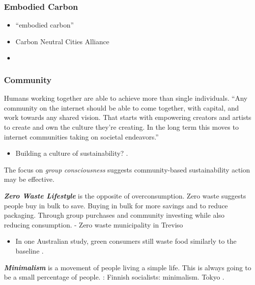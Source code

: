 \documentclass[
  letterpaper,
  DIV=11,
  numbers=noendperiod]{scrartcl}
\providecommand{\tightlist}{%
  \setlength{\itemsep}{0pt}\setlength{\parskip}{0pt}}\usepackage{longtable,booktabs,array}
\begin{document}
\subsubsection{Embodied Carbon}\label{embodied-carbon}

\begin{itemize}
\tightlist
\item
  ``embodied carbon''
\item
  Carbon Neutral Cities Alliance
\item
  \citet{buildersforclimateactionMakingRealZero2021}
\end{itemize}

\subsubsection{Community}\label{community}

Humans working together are able to achieve more than single
individuals. ``Any community on the internet should be able to come
together, with capital, and work towards any shared vision. That starts
with empowering creators and artists to create and own the culture
they're creating. In the long term this moves to internet communities
taking on societal endeavors.''

\begin{itemize}
\tightlist
\item
  Building a culture of sustainability?
  \citep{lakshmirebeccaManWhoGamifying2018, armstrongCultivatingCulturesSustainability2021}.
\end{itemize}

The focus on \emph{group consciousness} suggests community-based
sustainability action may be effective.

\textbf{\emph{Zero Waste Lifestyle}} is the opposite of overconsumption.
Zero waste suggests people buy in bulk to save. Buying in bulk for more
savings and to reduce packaging. Through group purchases and community
investing while also reducing consumption. - Zero waste municipality in
Treviso

\begin{itemize}
\tightlist
\item
  In one Australian study, green consumers still waste food similarly to
  the baseline \citep{mccarthyFoodWasteGreen2017}.
\end{itemize}

\textbf{\emph{Minimalism}} is a movement of people living a simple life.
This is always going to be a small percentage of people.
\citep{costaHowFinnishCulture2018}: Finnish socialists: minimalism.
Tokyo \citep{tokyosimpleecolifeWhatLearnedMy2021}.
\end{document}
